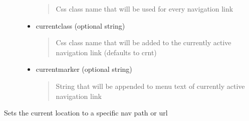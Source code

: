 \documentclass[letterpaper,10pt,english]{sphinxmanual}
\begin{document}
\begin{fulllineitems}
\begin{fulllineitems}
\begin{description}
\begin{itemize}
\begin{quote}
Css class name that will be used for every navigation link
\end{quote}

\item {} 
currentclass (optional string)
\begin{quote}

Css class name that will be added to the currently active navigation link (defaults to crnt)
\end{quote}

\item {} 
currentmarker (optional string)
\begin{quote}

String that will be appended to menu text of currently active navigation link
\end{quote}

\end{itemize}

\end{description}

\end{fulllineitems}


\begin{fulllineitems}
\label{knop_nav:knop_nav.setlocation}
\end{fulllineitems}


\begin{fulllineitems}
Sets the current location to a specific nav path or url

\end{fulllineitems}


\begin{fulllineitems}
\label{knop_nav:knop_nav.template}
\end{fulllineitems}



\begin{fulllineitems}
\end{fulllineitems}


\begin{fulllineitems}
\label{knop_nav:knop_nav.url}
\end{fulllineitems}


\end{fulllineitems}
\end{document}
